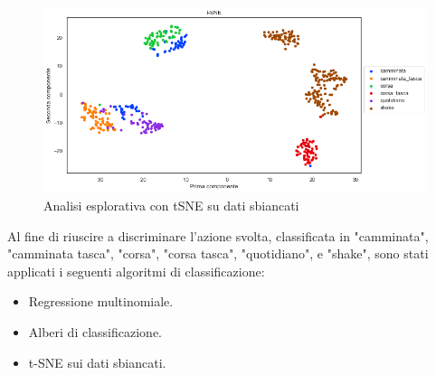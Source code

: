 \documentclass[./main.tex]{subfiles}
\begin{document}
\begin{figure}[H]
	\centering
	\includegraphics[width=.9\textwidth, height=.9\textheight, keepaspectratio]{../../figure/t-SNE.png}
	\caption{{ Analisi esplorativa con tSNE su dati sbiancati}}
	\label{tSNE}
\end{figure}
Al fine di riuscire a discriminare l'azione svolta, classificata in "camminata", "camminata tasca", "corsa", "corsa tasca", "quotidiano", e "shake", sono stati applicati i seguenti algoritmi di classificazione:
\begin{itemize}
	\item Regressione multinomiale.
	\item Alberi di classificazione.
	\item t-SNE sui dati sbiancati.
\end{itemize}
\end{document}
